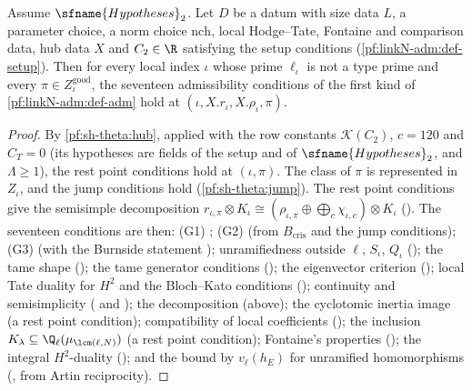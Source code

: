 \begin{theorem}\label{pf:sh-theta:setpt}
Assume $\sfname{Hypotheses}_2$. Let $D$ be a datum with size data $L$, a parameter choice, a norm choice $\mathrm{nch}$, local
Hodge--Tate, Fontaine and comparison data, hub data $X$ and $C_2\in\R$ satisfying the setup conditions
(\cref{pf:linkN-adm:def-setup}). Then for every local index $\iota$ whose prime $\ell_\iota$ is not a type prime and every
$\pi\in Z^{\mathrm{good}}_\iota$, the seventeen admissibility conditions of the first kind of \cref{pf:linkN-adm:def-adm} hold at
$(\iota,X.r_\iota,X.\rho_\iota,\pi)$.
\end{theorem}

\begin{proof}
By \cref{pf:sh-theta:hub}, applied with the row constants $\mathcal K(C_2)$, $c=120$ and $C_T=0$ (its hypotheses are fields of the
setup and of $\sfname{Hypotheses}_2$, and $\Lambda\ge1$), the rest point conditions hold at $(\iota,\pi)$. The class of $\pi$ is
represented in $Z_\iota$, and the jump conditions hold (\cref{pf:sh-theta:jump}). The rest point conditions give the semisimple
decomposition $r_{\iota,\pi}\otimes K_\iota\cong(\rho_{\iota,\pi}\oplus\bigoplus_c\chi_{\iota,c})\otimes K_\iota$
(). The seventeen conditions are then: (G1)
; (G2)  (from
$B_{\mathrm{cris}}$ and the jump conditions); (G3)  (with the
Burnside statement ); unramifiedness outside $\ell$, $S_\iota$, $Q_\iota$
(); the tame shape ();
the tame generator conditions (); the eigenvector criterion
(); local Tate duality for $H^2$ and the Bloch--Kato conditions
(); continuity and semisimplicity
( and ); the decomposition (above);
the cyclotomic inertia image (a rest point condition); compatibility of local coefficients
(); the inclusion
$K_\lambda\subseteq\Q_\ell(\mu_{\lcm(\ell,N)})$ (a rest point condition); Fontaine's properties
(); the integral $H^2$-duality
(); and the bound by $v_\ell(h_E)$ for unramified homomorphisms
(, from Artin reciprocity).
\end{proof}

